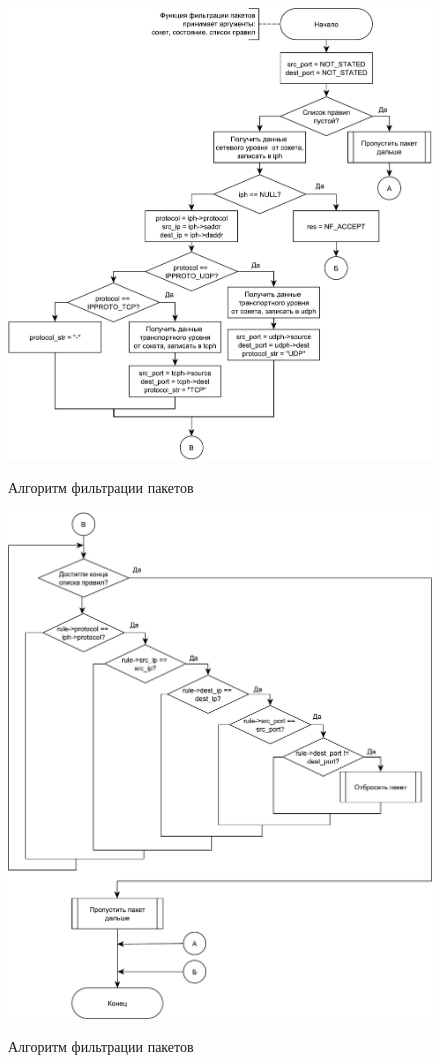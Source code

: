 \begin{figure}[h!]
	\begin{center}
		{\includegraphics[scale = 0.56]{img/filter1.pdf}}
		\caption{Алгоритм фильтрации пакетов}
		\label{fig27:image}
	\end{center}
\end{figure}

\begin{figure}[h!]
	\begin{center}
		{\includegraphics[scale = 0.56]{img/filter2.pdf}}
		\caption{Алгоритм фильтрации пакетов}
		\label{fig28:image}
	\end{center}
\end{figure}
